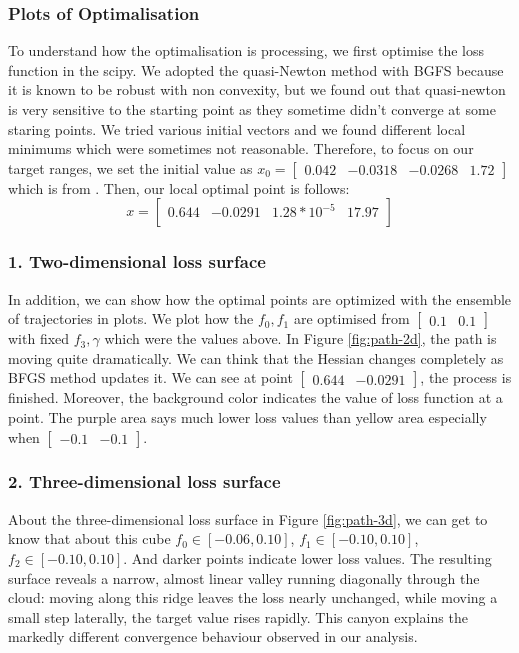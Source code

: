 \documentclass[12pt]{article}
\begin{document}
\subsubsection{Plots of Optimalisation}
To understand how the optimalisation is processing, we first optimise the loss function in the scipy. We adopted the quasi-Newton method with BGFS because it is known to be robust with non convexity, but we found out that quasi-newton is very sensitive to the starting point as they sometime didn't converge at some staring points. We tried various initial vectors and we found different local minimums which were sometimes not reasonable. Therefore, to focus on our target ranges, we set the initial value as $x_0=\begin{bmatrix}
    0.042&-0.0318&-0.0268&1.72
\end{bmatrix}$ which is from \cite{DieboldLi2006}. Then, our local optimal point is follows:
\[ x = 
\begin{bmatrix}
0.644 & -0.0291 & 1.28*10^{-5} & 17.97 \\

\end{bmatrix}
\]
\subsubsection*{1. Two-dimensional loss surface}
In addition, we can show how the optimal points are optimized with the ensemble of trajectories in plots. We plot how the $f_0, f_1$ are optimised from $\begin{bmatrix}
    0.1&0.1
\end{bmatrix}$ with fixed $f_3, \gamma$ which were the values above. In Figure \ref{fig:path-2d}, the path is moving quite dramatically. We can think that the Hessian changes completely as BFGS method updates it. We can see at point $\begin{bmatrix}
    0.644 & -0.0291 
\end{bmatrix}$, the process is finished. Moreover, the background color indicates the value of loss function at a point. The purple area says much lower loss values than yellow area especially when $\begin{bmatrix}
    -0.1 & -0.1 
\end{bmatrix}$.


\subsubsection*{2. Three-dimensional loss surface}
About the three-dimensional loss surface in Figure \ref{fig:path-3d}, we can get to know that about this cube $f_0\!\in[-0.06,0.10]$, $f_1\!\in[-0.10,0.10]$, $f_2\!\in[-0.10,0.10]$.  And darker points indicate lower loss values. The resulting surface reveals a narrow, almost linear valley running diagonally through the cloud: moving along this ridge leaves the loss nearly unchanged, while moving a small step laterally, the target value rises rapidly. This canyon explains the markedly different convergence behaviour observed in our analysis.
\end{document}
